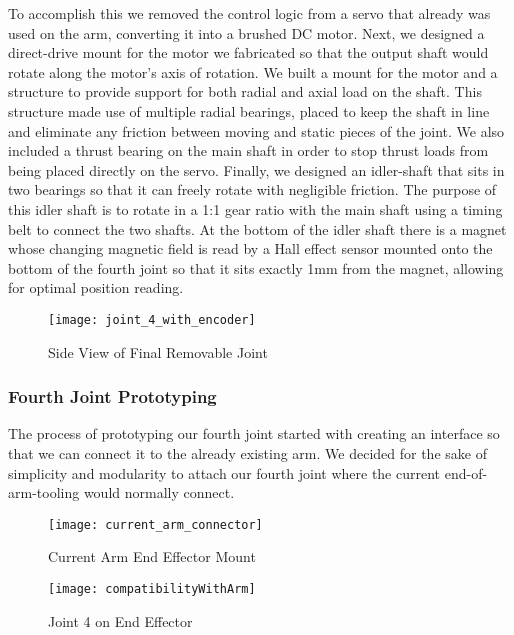 To accomplish this we removed the control logic from a servo that already was used on the arm, converting it into a brushed DC motor. Next, we designed a direct-drive mount for the motor we fabricated so that the output shaft would rotate along the motor's axis of rotation.  We built a mount for the motor and a structure to provide support for both radial and axial load on the shaft. This structure made use of multiple radial bearings, placed to keep the shaft in line and eliminate any friction between moving and static pieces of the joint.  We also included a thrust bearing on the main shaft in order to stop thrust loads from being placed directly on the servo.  Finally, we designed an idler-shaft that sits in two bearings so that it can freely rotate with negligible friction. The purpose of this idler shaft is to rotate in a 1:1 gear ratio with the main shaft using a timing belt to connect the two shafts.  At the bottom of the idler shaft there is a magnet whose changing magnetic field is read by a Hall effect sensor mounted onto the bottom of the fourth joint so that it sits exactly 1mm from the magnet, allowing for optimal position reading.  \\

\begin{figure}[H]
	\centering
	\texttt{[image: joint\_4\_with\_encoder]}
	\caption{Side View of Final Removable Joint}
	\label{fig:Side View of Joint 4}
\end{figure}


\subsubsection{Fourth Joint Prototyping}


The process of prototyping our fourth joint started with creating an interface so that we can connect it to the already existing arm.  We decided for the sake of simplicity and modularity to attach our fourth joint where the current end-of-arm-tooling would normally connect.


\begin{figure}[H]
	\centering
	\texttt{[image: current\_arm\_connector]}
	\caption{Current Arm End Effector Mount}
	\label{Current Arm Encoder Mount}
\end{figure}

\begin{figure}[H]
	\centering
	\texttt{[image: compatibilityWithArm]}
	\caption{Joint 4 on End Effector}
	\label{lbl:Joint 4 on End Effector}
\end{figure}

